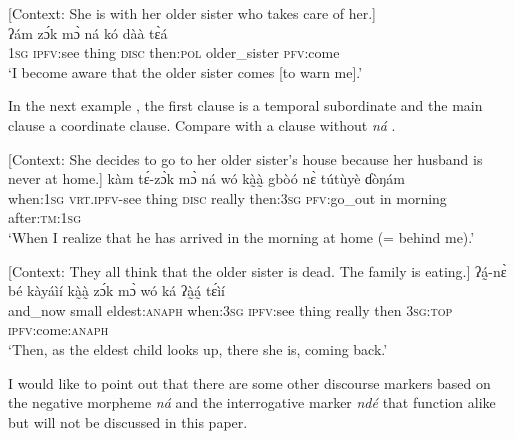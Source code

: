 \documentclass[output=paper,colorlinks=true, citecolor=brown]{langscibook}
\begin{document}
\ea\label{ex:gba:91}[Context: She is with her older sister who takes care of her.]\\
    \gll ʔám zɔ́k mɔ̀ ná kó dàà tɛ̀á \\ 
         \textsc{1sg} \textsc{ipfv}:see thing \textsc{disc} then:\textsc{pol} older\_sister \textsc{pfv}:come \\
    \glt ‘I become aware that the older sister comes [to warn me].’
\z 

In the next example , the first clause is a temporal subordinate and the main clause a coordinate clause. Compare with a clause without \textit{ná} . 

\ea\label{ex:gba:92}[Context: She decides to go to her older sister's house because her husband is never at home.]\newline 
    \gll kàm tɛ́-zɔ̀k mɔ̀ ná wó kà̰à̰   gbòó nɛ̀ tútùyè ɗòŋám \\ 
         when:\textsc{1sg} \textsc{vrt.ipfv}-see thing \textsc{disc} really then:\textsc{3sg} \textsc{pfv}:go\_out in morning after:\textsc{tm:1sg} \\
    \glt ‘When I realize that he has arrived in the morning at home (= behind me).’
\z 

\ea\label{ex:gba:93}[Context: They all think that the older sister is dead. The family is eating.] \newline
    \gll ʔá̰-nɛ̀ bé kàyáìí  kà̰à̰  zɔ́k mɔ̀ wó ká ʔà̰á̰  tɛ́ìí \\ 
         and\_now small eldest:\textsc{anaph}  when:\textsc{3sg} \textsc{ipfv}:see thing really then \textsc{3sg:top} \textsc{ipfv}:come:\textsc{anaph} \\
    \glt ‘Then, as the eldest child looks up, there she is, coming back.’
\z 

I would like to point out that there are some other discourse markers based on the negative morpheme \textit{ná} and the interrogative marker \textit{ndé} that function alike but will not be discussed in this paper.
\end{document}
